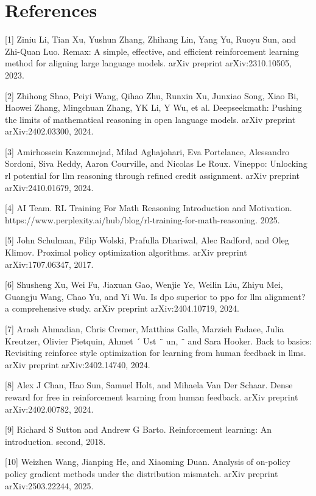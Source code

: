 \documentclass[11pt,english]{ctexart}
\begin{document}
\section{References}
[1] Ziniu Li, Tian Xu, Yushun Zhang, Zhihang Lin, Yang Yu, Ruoyu Sun, and Zhi-Quan Luo. Remax: A simple, effective, and efficient reinforcement learning method for aligning large language models. arXiv preprint arXiv:2310.10505, 2023.

[2] Zhihong Shao, Peiyi Wang, Qihao Zhu, Runxin Xu, Junxiao Song, Xiao Bi, Haowei Zhang, Mingchuan Zhang,
YK Li, Y Wu, et al. Deepseekmath: Pushing the limits of mathematical reasoning in open language models. arXiv preprint arXiv:2402.03300, 2024.

[3] Amirhossein Kazemnejad, Milad Aghajohari, Eva Portelance, Alessandro Sordoni, Siva Reddy, Aaron Courville, and Nicolas Le Roux. Vineppo: Unlocking rl potential for llm reasoning through refined credit assignment. arXiv preprint arXiv:2410.01679, 2024.

[4] AI Team. RL Training For Math Reasoning Introduction and Motivation. https://www.perplexity.ai/hub/blog/rl-training-for-math-reasoning. 2025.

[5] John Schulman, Filip Wolski, Prafulla Dhariwal, Alec Radford, and Oleg Klimov. Proximal policy optimization algorithms. arXiv preprint arXiv:1707.06347, 2017.

[6]  Shusheng Xu, Wei Fu, Jiaxuan Gao, Wenjie Ye, Weilin Liu, Zhiyu Mei, Guangju Wang, Chao Yu, and Yi Wu. Is dpo superior to ppo for llm alignment? a comprehensive study. arXiv preprint arXiv:2404.10719, 2024.

[7] Arash Ahmadian, Chris Cremer, Matthias Galle, Marzieh Fadaee, Julia Kreutzer, Olivier Pietquin, Ahmet ´ Ust ¨ un, ¨ and Sara Hooker. Back to basics: Revisiting reinforce style optimization for learning from human feedback in llms. arXiv preprint arXiv:2402.14740, 2024.

[8] Alex J Chan, Hao Sun, Samuel Holt, and Mihaela Van Der Schaar. Dense reward for free in reinforcement learning from human feedback. arXiv preprint arXiv:2402.00782, 2024.

[9] Richard S Sutton and Andrew G Barto. Reinforcement learning: An introduction. second, 2018.

[10] Weizhen Wang, Jianping He, and Xiaoming Duan. Analysis of on-policy policy gradient methods under the distribution mismatch. arXiv preprint arXiv:2503.22244, 2025.
\end{document}

